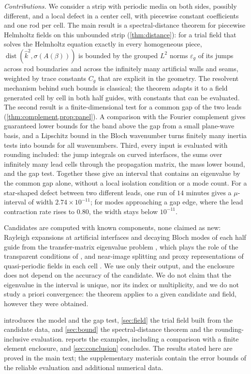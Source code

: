 \emph{Contributions.} We consider a strip with periodic media on both sides,
possibly different, and a local defect in a center cell, with piecewise
constant coefficients and one rod per cell. The main result is a
spectral-distance theorem for piecewise Helmholtz fields on this unbounded
strip (\cref{thm:distance}): for a trial field that solves the Helmholtz
equation exactly in every homogeneous piece,
$\operatorname{dist}(\widehat k^2,\sigma(A(\beta)))$ is bounded by the grouped
$L^2$ norms $\varepsilon_g$ of its jumps across rod boundaries and across the
infinitely many artificial walls and seams, weighted by trace constants $C_g$
that are explicit in the geometry. The resolvent mechanism behind such bounds
is classical; the theorem adapts it to a field generated cell by cell in both
half guides, with constants that can be evaluated. The second result is a
finite-dimensional test for a common gap of the two leads
(\cref{thm:complement,prop:panel}). A comparison with the Fourier complement
gives guaranteed lower bounds for the band above the gap from a small
plane-wave basis, and a Lipschitz bound in the Bloch wavenumber turns finitely
many inertia tests into bounds for all wavenumbers. Third, every input is
evaluated with rounding included: the jump integrals on curved interfaces, the
sums over infinitely many lead cells through the propagation matrix, the mass
lower bound, and the gap test. Together these give an interval that contains an
eigenvalue by the common gap alone, without a local isolation condition or a
mode count. For a star-shaped defect between two different leads, one run of
$14$ minutes gives a $\mu$-interval of width $2.74\times10^{-11}$; for modes
approaching a gap edge, where the lead contraction rate rises to $0.80$, the
width stays below $10^{-11}$.

Candidates are computed with known components, none claimed as new: Rayleigh
expansions at artificial interfaces and decaying Bloch modes of each half guide
from the transfer-matrix eigenvalue problem \cite{BottenEtAl2004}, which plays
the role of the transparent conditions of
\cite{JolyLiFliss2006,Fliss2013,FlissKlindworthSchmidt2015}, and near-image
splitting and proxy representations of quasi-periodic fields in each cell
\cite{BarnettGreengard2010,BarnettGreengard2011,ChoBarnett2015}. We use only
their output, and the enclosure does not depend on the accuracy of the
candidate. We do not claim that the eigenvalue in the interval is unique, nor
its index or multiplicity, and we do not study a priori convergence: the
theorem applies to a given candidate and field, however they were obtained.

 introduces the model and the gap test, \cref{sec:field}
the trial field built from the candidate data, and \cref{sec:bound} the
spectral-distance theorem and the rounding-inclusive evaluation.
 reports the examples, including a comparison with a finite
element enclosure, and \cref{sec:conclusion} concludes. The results stated here
are proved in the main text; the supplementary materials contain the error
bounds of the reliable evaluation and additional numerical data.
